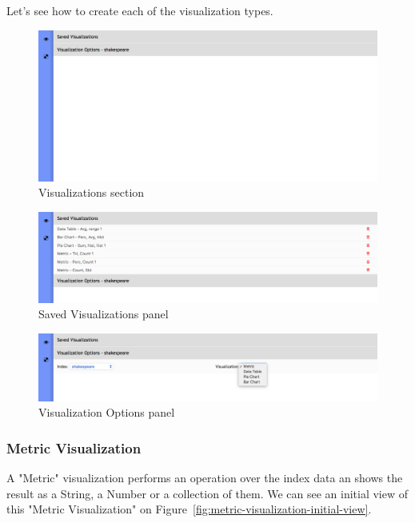 \documentclass[a4paper, 12pt, english]{book}
\begin{document}
Let's see how to create each of the visualization types.

\begin{figure}
  \centering
  \includegraphics[width=13cm, keepaspectratio]{img/visualizations-section}
  \caption{Visualizations section}
  \label{fig:visualizations-section}
\end{figure}

\begin{figure}
  \centering
  \includegraphics[width=13cm, keepaspectratio]{img/saved-visualizations.png}
  \caption{Saved Visualizations panel}
  \label{fig:saved-visualizations}
\end{figure}

\begin{figure}
  \centering
  \includegraphics[width=13cm, keepaspectratio]{img/visualization-options.png}
  \caption{Visualization Options panel}
  \label{fig:visualization-options}
\end{figure}

\subsubsection{Metric Visualization}
\label{sec:metric-visualization}
A "Metric" visualization performs an operation over the index data an shows the result as a String, a Number or a collection of them. We can see an initial view of this "Metric Visualization" on Figure~\ref{fig:metric-visualization-initial-view}.
\end{document}
